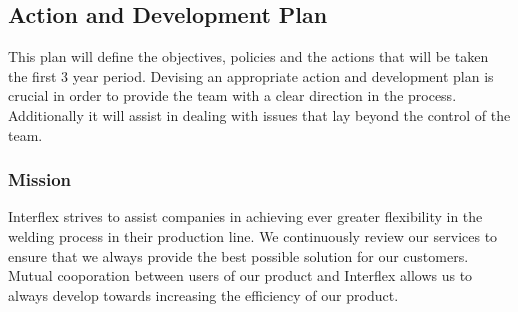 \subsection{Action and Development Plan}
\label{sec:actionDevelopmentPlan}
This plan will define the objectives, policies and the actions that will be taken the first 3 year period.
Devising an appropriate action and development plan is crucial in order to provide the team with a clear direction in the process.
Additionally it will assist in dealing with issues that lay beyond the control of the team.


\subsubsection{Mission}
Interflex strives to assist companies in achieving ever greater flexibility in the welding process in their production line.
We continuously review our services to ensure that we always provide the best possible solution for our customers.
Mutual cooporation between users of our product and Interflex allows us to always develop towards increasing the efficiency of our product.



